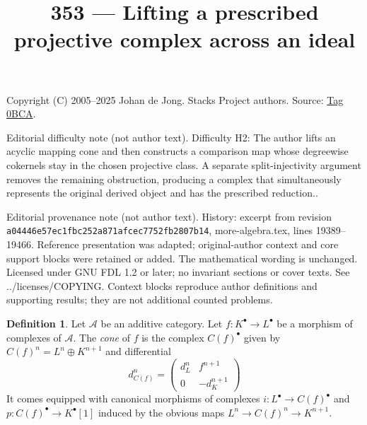 \documentclass{amsart}
\theoremstyle{plain}
\theoremstyle{definition}
\newtheorem{definition}[subsection]{Definition}
\theoremstyle{remark}
\numberwithin{equation}{subsection}
\begin{document}
\title[Stacks Project, Tag 0BCA]{353 --- Lifting a prescribed projective complex across an ideal}
\maketitle
\noindent Copyright (C) 2005--2025 Johan de Jong. Stacks Project authors. Source: \href{https://stacks.math.columbia.edu/tag/0BCA}{Tag 0BCA}.

\noindent Editorial difficulty note (not author text). Difficulty H2: The author lifts an acyclic mapping cone and then constructs a comparison map whose degreewise cokernels stay in the chosen projective class. A separate split-injectivity argument removes the remaining obstruction, producing a complex that simultaneously represents the original derived object and has the prescribed reduction..

\noindent Editorial provenance note (not author text). History: excerpt from revision \texttt{a0444\allowbreak 6e57e\allowbreak c1fbc\allowbreak 252a8\allowbreak 71afc\allowbreak ec775\allowbreak 2fb28\allowbreak 07b14}, more-algebra.tex, lines 19389--19466. Reference presentation was adapted; original-author context and core support blocks were retained or added. The mathematical wording is unchanged. Licensed under GNU FDL 1.2 or later; no invariant sections or cover texts. See ../licenses/COPYING. Context blocks reproduce author definitions and supporting results; they are not additional counted problems.

\begin{definition}
\label{derived-definition-cone}
Let $\mathcal{A}$ be an additive category.
Let $f : K^\bullet \to L^\bullet$ be a morphism of
complexes of $\mathcal{A}$. The {\it cone} of $f$
is the complex $C(f)^\bullet$ given by
$C(f)^n = L^n \oplus K^{n + 1}$ and
differential
$$
d_{C(f)}^n =
\left(
\begin{matrix}
d^n_L & f^{n + 1} \\
0 & -d_K^{n + 1}
\end{matrix}
\right)
$$
It comes equipped with canonical morphisms of complexes
$i : L^\bullet \to C(f)^\bullet$ and $p : C(f)^\bullet \to K^\bullet[1]$
induced by the obvious maps $L^n \to C(f)^n \to K^{n + 1}$.
\end{definition}
\end{document}
